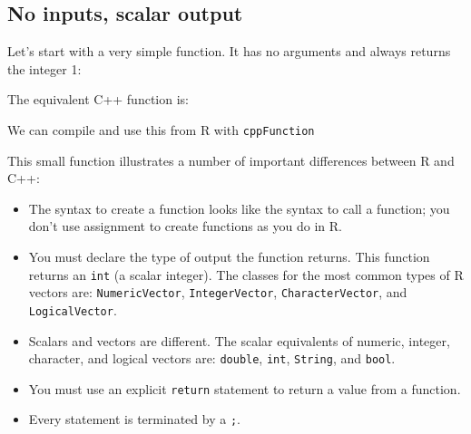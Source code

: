 \subsection{No inputs, scalar output}

Let's start with a very simple function. It has no arguments and always
returns the integer 1:

\begin{Shaded}
\begin{Highlighting}[]
\StringTok{ }
\end{Highlighting}
\end{Shaded}

The equivalent C++ function is:

\begin{Shaded}
\begin{Highlighting}[]
 
   \NormalTok{;}
\NormalTok{\}}
\end{Highlighting}
\end{Shaded}

We can compile and use this from R with \texttt{cppFunction}

\begin{Shaded}
\begin{Highlighting}[]
\NormalTok{(}
\NormalTok{)}
\end{Highlighting}
\end{Shaded}

This small function illustrates a number of important differences
between R and C++:

\begin{itemize}
\item
  The syntax to create a function looks like the syntax to call a
  function; you don't use assignment to create functions as you do in R.
\item
  You must declare the type of output the function returns. This
  function returns an \texttt{int} (a scalar integer). The classes for
  the most common types of R vectors are: \texttt{NumericVector},
  \texttt{IntegerVector}, \texttt{CharacterVector}, and
  \texttt{LogicalVector}.
\item
  Scalars and vectors are different. The scalar equivalents of numeric,
  integer, character, and logical vectors are: \texttt{double},
  \texttt{int}, \texttt{String}, and \texttt{bool}.
\item
  You must use an explicit \texttt{return} statement to return a value
  from a function.
\item
  Every statement is terminated by a \texttt{;}.
\end{itemize}

